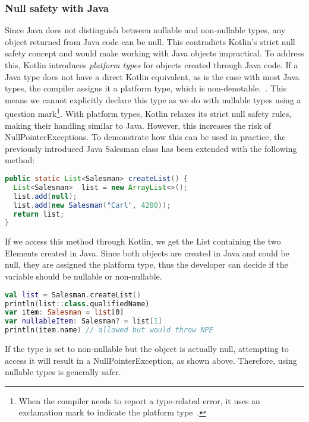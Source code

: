 \documentclass[a4paper,11pt]{article}
\begin{document}
\subsubsection{Null safety with Java}
Since Java does not distinguish between nullable and non-nullable types, any object returned from Java code can be null. This contradicts Kotlin's strict null safety concept and would make working with Java objects impractical.
To address this, Kotlin introduces \textit{platform types} for objects created through Java code. If a Java type does not have a direct Kotlin equivalent, as is the case with most Java types, the compiler assigns it a platform type, which is non-denotable.~\cite{interop-null-safety}. This means we cannot explicitly declare this type as we do with nullable types using a question mark\footnote{When the compiler needs to report a type-related error, it uses an exclamation mark to indicate the platform type~\cite{interop-platform-notation}.}. With platform types, Kotlin relaxes its strict null safety rules, making their handling similar to Java. However, this increases the risk of NullPointerExceptions.
To demonstrate how this can be used in practice, the previously introduced Java Salesman class has been extended with the following method:
\begin{lstlisting}[language=Java]
public static List<Salesman> createList() {
  List<Salesman>  list = new ArrayList<>();
  list.add(null);
  list.add(new Salesman("Carl", 4200));
  return list;
}
\end{lstlisting}
If we access this method through Kotlin, we get the List containing the two Elements created in Java. Since both objects are created in Java and could be null, they are assigned the platform type, thus the developer can decide if the variable should be nullable or non-nullable.
\begin{lstlisting}[language=Kotlin]  
val list = Salesman.createList()
println(list::class.qualifiedName)
var item: Salesman = list[0]
var nullableItem: Salesman? = list[1]
println(item.name) // allowed but would throw NPE
\end{lstlisting}
If the type is set to non-nullable but the object is actually null, attempting to access it will result in a NullPointerException, as shown above. Therefore, using nullable types is generally safer.
\end{document}
